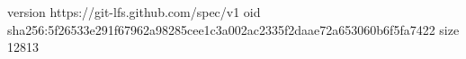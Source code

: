 version https://git-lfs.github.com/spec/v1
oid sha256:5f26533e291f67962a98285cee1c3a002ac2335f2daae72a653060b6f5fa7422
size 12813
